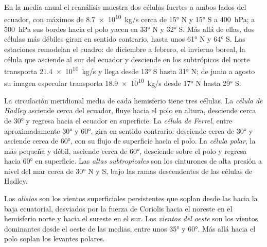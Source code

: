 En la media anual el reanálisis muestra dos células fuertes a ambos lados del ecuador, con máximos de \qty{8.7e10}{kg/s} cerca de \ang{15} N y \ang{15} S a \qty{400}{hPa}; a \qty{500}{hPa} sus bordes hacia el polo yacen en \ang{33} N y \ang{32} S. Más allá de ellas, dos células más débiles giran en sentido contrario, hasta unos \ang{61} N y \ang{64} S.
Las estaciones remodelan el cuadro: de diciembre a febrero, el invierno boreal, la célula que asciende al sur del ecuador y desciende en los subtrópicos del norte transporta \qty{21.4e10}{kg/s} y llega desde \ang{13} S hasta \ang{31} N; de junio a agosto su imagen especular transporta \qty{18.9e10}{kg/s} desde \ang{17} N hasta \ang{29} S.

\begin{definition}\label{def:b1:atmospheric-circulation:cells}
La circulación meridional media de cada hemisferio tiene tres células. La \emph{célula de Hadley} asciende cerca del ecuador, fluye hacia el polo en altura, desciende cerca de \ang{30} y regresa hacia el ecuador en superficie. La \emph{célula de Ferrel}, entre aproximadamente \ang{30} y \ang{60}, gira en sentido contrario: desciende cerca de \ang{30} y asciende cerca de \ang{60}, con su flujo de superficie hacia el polo. La \emph{célula polar}, la más pequeña y débil, asciende cerca de \ang{60}, desciende sobre el polo y regresa hacia \ang{60} en superficie. Las \emph{altas subtropicales} son los cinturones de alta presión a nivel del mar cerca de \ang{30} N y S, bajo las ramas descendentes de las células de Hadley.
\end{definition}

\begin{definition}\label{def:b1:atmospheric-circulation:winds}
Los \emph{alisios} son los vientos superficiales persistentes que soplan desde las  hacia la baja ecuatorial, desviados por la fuerza de Coriolis hacia el noreste en el hemisferio norte y hacia el sureste en el sur. Los \emph{vientos del oeste} son los vientos dominantes desde el oeste de las  medias, entre unos \ang{35} y \ang{60}. Más allá hacia el polo soplan los levantes polares.
\end{definition}

